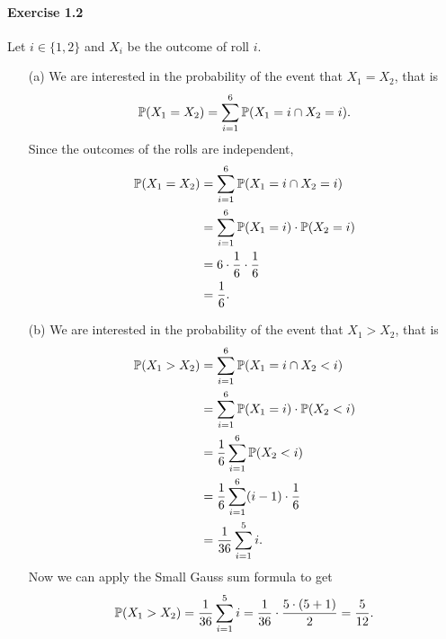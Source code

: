 \paragraph{Exercise 1.2} Let $i \in \{ 1,2 \}$ and $X_i$ be the outcome of roll $i$.
\begin{enumerate}
  \item[(a)] We are interested in the probability of the event that $X_1 = X_2$,
    that is
    \[
      \mathbb{P}(X_1 = X_2) = \sum_{i=1}^6 \mathbb{P}(X_1 = i \cap X_2 = i).
    \]
    Since the outcomes of the rolls are independent,
    \begin{align*}
      \mathbb{P}(X_1 = X_2)  &= \sum_{i=1}^6 \mathbb{P}(X_1 = i \cap X_2 = i) \\
                      &= \sum_{i=1}^6 \mathbb{P}(X_1 = i) \cdot \mathbb{P}(X_2 = i) \\
                      &= 6 \cdot \frac{1}{6} \cdot \frac{1}{6} \\
                      &= \frac{1}{6}.
    \end{align*}

  \item[(b)] We are interested in the probability of the event that $X_1 > X_2$,
    that is
    \begin{align*}
      \mathbb{P}(X_1 > X_2)  &= \sum_{i=1}^6 \mathbb{P}(X_1 = i \cap X_2 < i) \\
                      &= \sum_{i=1}^6 \mathbb{P}(X_1 = i) \cdot \mathbb{P}(X_2 < i) \\
                      &= \frac{1}{6} \sum_{i=1}^6 \mathbb{P}(X_2 < i) \\
                      &= \frac{1}{6} \sum_{i=1}^6 (i-1) \cdot \frac{1}{6} \\
                      &= \frac{1}{36} \sum_{i=1}^5 i.
    \end{align*}
    Now we can apply the Small Gauss sum formula to get
    \[
      \mathbb{P}(X_1 > X_2) = \frac{1}{36} \sum_{i=1}^5 i
        = \frac{1}{36} \cdot \frac{5 \cdot (5 + 1)}{2}
        = \frac{5}{12}.
    \]


\end{enumerate}
